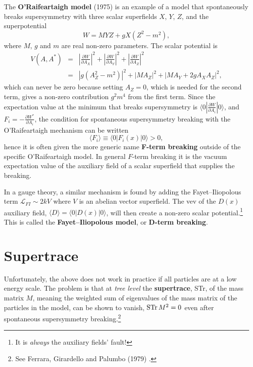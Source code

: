 \documentclass[notes.tex]{subfiles}
\begin{document}
The {\bf O'Raifeartaigh model} (1975) \cite{O'Raifeartaigh:1975pr} is an example of a model that spontaneously breaks supersymmetry with three scalar superfields $X$, $Y$, $Z$, and the superpotential
\begin{equation}
W=M YZ+gX(Z^2-m^2),
\end{equation}
where $M$, $g$ and $m$ are real non-zero parameters. The scalar potential is
\begin{eqnarray}
V(A, A^*)&=&\left|\frac{\partial W}{\partial A_X}\right|^2+\left|\frac{\partial W}{\partial A_Y}\right|^2+\left|\frac{\partial W}{\partial A_Z}\right|^2\nonumber\\
&=&|g(A_Z^2-m^2)|^2+|M A_Z|^2 +|MA_Y+2gA_XA_Z|^2,
\end{eqnarray}
which can never be zero because setting $A_Z=0$, which is needed for the second term, gives a non-zero contribution $g^2m^4$ from the first term. Since the expectation value at the minimum that breaks supersymmetry is $\langle0|\frac{\partial W}{\partial A_i}|0\rangle$, and $F_i = -\frac{\partial W^*}{\partial A_i}$, the condition for spontaneous supersymmetry breaking with the O'Raifeartaigh mechanism can be written 
\begin{equation}
\langle F_i \rangle \equiv\langle 0|F_i(x)|0\rangle > 0,
\label{eq:Fbreaking}
\end{equation}
hence it is often given the more generic name {\bf F-term breaking} outside of the specific O'Raifeartaigh model. In general $F$-term breaking it is the vacuum expectation value of the auxiliary field of a scalar superfield that supplies the breaking.

In a gauge theory, a similar mechanism is found by adding the Fayet--Iliopolous term $\mathcal{L}_{FI} \sim 2 kV$ where $V$ is an abelian vector superfield. The vev of the $D(x)$ auxiliary field, $\langle D\rangle=\langle 0|D(x)|0\rangle$, will then create a non-zero scalar potential.\footnote{It is {\it always} the auxiliary fields' fault!} This is called the {\bf Fayet--Iliopolous model}, or {\bf D-term breaking}.



\section{Supertrace}
Unfortunately, the above does not work in practice if all particles are at a low energy scale. The problem is that at {\it tree level} the {\bf supertrace}, STr, of the mass matrix $M$, meaning the weighted sum of eigenvalues of the mass matrix of the particles in the model, can be shown to vanish, ${\rm STr}\,M^2 = 0$ even after spontaneous supersymmetry breaking.\footnote{See Ferrara, Girardello and Palumbo (1979) \cite{Ferrara:1979wa}.}
\end{document}
